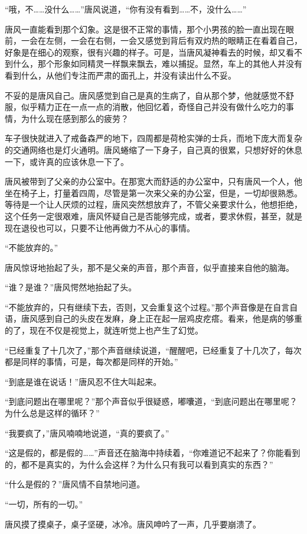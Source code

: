 “哦，不……没什么……”唐风说道，“你有没有看到……不，没什么……” 

唐风一直能看到那个幻象。这是很不正常的事情，那个小男孩的脸一直出现在眼前，一会在左侧，一会在右侧，一会又感觉到背后有双灼热的眼睛正在看着自己，好象是在细心的观察，很有兴趣的样子。可是，当唐风凝神看去的时候，却又看不到什么，那个形象如同精灵一样飘来飘去，难以捕捉。显然，车上的其他人并没有看到什么，从他们专注而严肃的面孔上，并没有读出什么不妥。 

不妥的是唐风自己。唐风感觉到自己是真的生病了，自从那个梦，他就感觉不舒服，似乎精力正在一点一点的消散，他回忆着，奇怪自己并没有做什么吃力的事情，为什么现在感到那么的疲劳？ 

车子很快就进入了戒备森严的地下，四周都是荷枪实弹的士兵，而地下庞大而复杂的交通网络也是灯火通明。唐风蜷缩了一下身子，自己真的很累，只想好好的休息一下，或许真的应该休息一下了。 

唐风被带到了父亲的办公室中。在那宽大而舒适的办公室中，只有唐风一个人，他坐在椅子上，打量着四周，尽管是第一次来父亲的办公室，但是，一切却很熟悉。等待是一个让人厌烦的过程，唐风突然想放弃了，不管父亲要求什么，他想拒绝，这个任务一定很艰难，唐风怀疑自己是否能够完成，或者，要求休假，甚至，就是现在退役也可以，只要不让他再做力不从心的事情。 

“不能放弃的。” 

唐风惊讶地抬起了头，那不是父亲的声音，那个声音，似乎直接来自他的脑海。 

“谁？是谁？”唐风愕然地抬起了头。 

“不能放弃的，只有继续下去，否则，又会重复这个过程。”那个声音像是在自言自语，唐风感到自己的头皮在发麻，身上正在起一层鸡皮疙瘩。看来，他是病的够重的了，现在不仅是视觉上，就连听觉上也产生了幻觉。 

“已经重复了十几次了，”那个声音继续说道，“醒醒吧，已经重复了十几次了，每次都是同样的事情，可是，每次都是同样的开始。” 

“到底是谁在说话！”唐风忍不住大叫起来。 

“到底问题出在哪里呢？”那个声音似乎很疑惑，嘟囔道，“到底问题出在哪里呢？为什么总是这样的循环？” 

“我要疯了，”唐风喃喃地说道，“真的要疯了。” 

“这是假的，都是假的……”声音还在脑海中持续着，“你难道记不起来了？你能看到的，都不是真实的，为什么会这样？为什么只有我可以看到真实的东西？” 

“什么是假的？”唐风情不自禁地问道。 

“一切，所有的一切。” 

唐风摸了摸桌子，桌子坚硬，冰冷。唐风呻吟了一声，几乎要崩溃了。 

